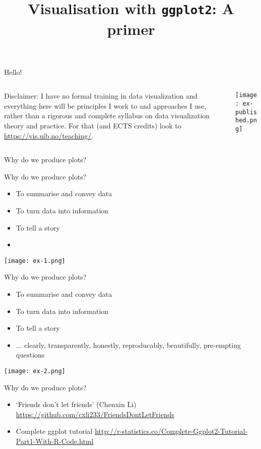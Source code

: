 \documentclass[10pt]{beamer}
\title{Visualisation with \texttt{ggplot2}: A primer}
\institute{\vspace{-0.8cm} \\ \large Iain Johnston \vspace{0.25cm} \\ \scriptsize Department of Mathematics\\ University of Bergen\\ \vspace{0.4cm}} %
\date{}
\begin{document}
\frame{\titlepage}

\begin{frame}{Hello!}
  \begin{columns}
    \begin{column}{0.5\textwidth}
      Disclaimer: I have no formal training in data visualization and everything here will be principles I work to and approaches I use, rather than a rigorous and complete syllabus on data visualization theory and practice. For that (and ECTS credits) look to \url{https://vis.uib.no/teaching/}.
    \end{column}
    \begin{column}{0.5\textwidth}
      \texttt{[image: ex-published.png]}
    \end{column}
    \end{columns}
\end{frame}

\begin{frame}{Why do we produce plots?}
\end{frame}

\begin{frame}{Why do we produce plots?}
      \begin{itemize}
      \item To summarise and convey data
      \item To turn data into information
      \item To tell a story
        \item[]
      \end{itemize}
      \texttt{[image: ex-1.png]}
\end{frame}

\begin{frame}{Why do we produce plots?}
      \begin{itemize}
      \item To summarise and convey data
      \item To turn data into information
      \item To tell a story
        \item ... clearly, transparently, honestly, reproducably, beautifully, pre-empting questions
      \end{itemize}
      \texttt{[image: ex-2.png]}
\end{frame}

\begin{frame}{Why do we produce plots?}
      \begin{itemize}
      \item `Friends don't let friends' (Chenxin Li) \url{https://github.com/cxli233/FriendsDontLetFriends}
        \item Complete ggplot tutorial \url{http://r-statistics.co/Complete-Ggplot2-Tutorial-Part1-With-R-Code.html}
      \end{itemize}
\end{frame}
\end{document}
